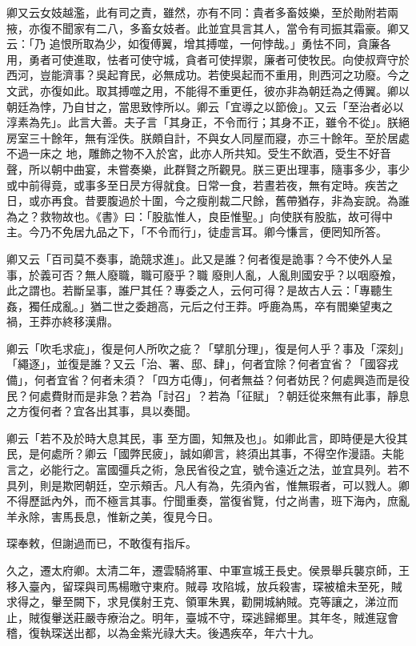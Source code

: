 \begin{pinyinscope}
 卿又云女妓越濫，此有司之責，雖然，亦有不同：貴者多畜妓樂，至於勛附若兩掖，亦復不聞家有二八，多畜女妓者。此並宜具言其人，當令有司振其霜豪。卿又云：「乃
 追恨所取為少，如復傅翼，增其搏噬，一何悖哉。」勇怯不同，貪廉各用，勇者可使進取，怯者可使守城，貪者可使捍禦，廉者可使牧民。向使叔齊守於西河，豈能濟事？吳起育民，必無成功。若使吳起而不重用，則西河之功廢。今之文武，亦復如此。取其搏噬之用，不能得不重更任，彼亦非為朝廷為之傅翼。卿以朝廷為悖，乃自甘之，當思致悖所以。卿云「宜導之以節儉」。又云「至治者必以淳素為先」。此言大善。夫子言「其身正，不令而行；其身不正，雖令不從」。朕絕房室三十餘年，無有淫佚。朕頗自計，不與女人同屋而寢，亦三十餘年。至於居處不過一床之
 地，雕飾之物不入於宮，此亦人所共知。受生不飲酒，受生不好音聲，所以朝中曲宴，未嘗奏樂，此群賢之所觀見。朕三更出理事，隨事多少，事少或中前得竟，或事多至日昃方得就食。日常一食，若晝若夜，無有定時。疾苦之日，或亦再食。昔要腹過於十圍，今之瘦削裁二尺餘，舊帶猶存，非為妄說。為誰為之？救物故也。《書》曰：「股肱惟人，良臣惟聖。」向使朕有股肱，故可得中主。今乃不免居九品之下，「不令而行」，徒虛言耳。卿今慊言，便罔知所答。



 卿又云「百司莫不奏事，詭競求進」。此又是誰？何者復是詭事？今不使外人呈事，於義可否？無人廢職，職可廢乎？職
 廢則人亂，人亂則國安乎？以咽廢飧，此之謂也。若斷呈事，誰尸其任？專委之人，云何可得？是故古人云：「專聽生姦，獨任成亂。」猶二世之委趙高，元后之付王莽。呼鹿為馬，卒有閻樂望夷之禍，王莽亦終移漢鼎。



 卿云「吹毛求疵」，復是何人所吹之疵？「擘肌分理」，復是何人乎？事及「深刻」「繩逐」，並復是誰？又云「治、署、邸、肆」，何者宜除？何者宜省？「國容戎備」，何者宜省？何者未須？「四方屯傳」，何者無益？何者妨民？何處興造而是役民？何處費財而是非急？若為「討召」？若為「征賦」？朝廷從來無有此事，靜息之方復何者？宜各出其事，具以奏聞。



 卿云「若不及於時大息其民，事
 至方圖，知無及也」。如卿此言，即時便是大役其民，是何處所？卿云「國弊民疲」，誠如卿言，終須出其事，不得空作漫語。夫能言之，必能行之。富國彊兵之術，急民省役之宜，號令遠近之法，並宜具列。若不具列，則是欺罔朝廷，空示頰舌。凡人有為，先須內省，惟無瑕者，可以戮人。卿不得歷詆內外，而不極言其事。佇聞重奏，當復省覽，付之尚書，班下海內，庶亂羊永除，害馬長息，惟新之美，復見今日。



 琛奉敕，但謝過而已，不敢復有指斥。



 久之，遷太府卿。太清二年，遷雲騎將軍、中軍宣城王長史。侯景舉兵襲京師，王移入臺內，留琛與司馬楊曒守東府。賊尋
 攻陷城，放兵殺害，琛被槍未至死，賊求得之，轝至闕下，求見僕射王克、領軍朱異，勸開城納賊。克等讓之，涕泣而止，賊復轝送莊嚴寺療治之。明年，臺城不守，琛逃歸鄉里。其年冬，賊進寇會稽，復執琛送出都，以為金紫光祿大夫。後遇疾卒，年六十九。




\end{pinyinscope}
